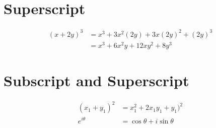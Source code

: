 \documentclass{article}
\begin{document}
\section{Superscript}

\begin{align}
(x + 2y)^3 &= x^3 + 3x^2(2y) + 3x(2y)^2 +(2y)^3\\
           &= x^3 + 6x^2y + 12xy^2 +8y^3
\end{align}

\section{Subscript and Superscript}

\begin{align}
(x_1 + y_1)^2 &= x_1^2 + 2x_1y_1 + y_1)^2\\
e^{i\theta}&=\cos \theta + i\sin \theta
\end{align}
\end{document}
